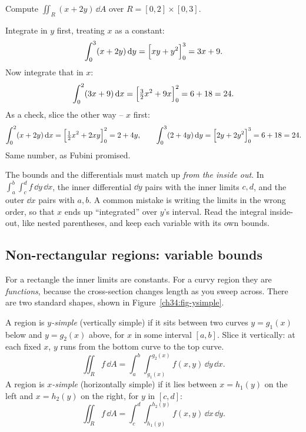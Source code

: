 \begin{example}
\label{ch34:ex-rect}
Compute $\displaystyle\iint_R (x+2y)\,\dd A$ over $R=[0,2]\times[0,3]$.

Integrate in $y$ first, treating $x$ as a constant:
\[
  \int_0^3 (x+2y)\,\mathrm{d} y
  =\Big[xy+y^2\Big]_{0}^{3}
  =3x+9 .
\]
Now integrate that in $x$:
\[
  \int_0^2 (3x+9)\,\mathrm{d} x
  =\Big[\tfrac{3}{2}x^2+9x\Big]_{0}^{2}
  =6+18=24 .
\]
As a check, slice the other way -- $x$ first:
\[
  \int_0^2 (x+2y)\,\mathrm{d} x=\Big[\tfrac12 x^2+2xy\Big]_{0}^{2}=2+4y,
  \qquad
  \int_0^3 (2+4y)\,\mathrm{d} y=\Big[2y+2y^2\Big]_{0}^{3}=6+18=24 .
\]
Same number, as Fubini promised.
\end{example}

\begin{trapbox}
The bounds and the differentials must match up \emph{from the inside out}. In
$\int_a^b\!\int_c^d f\,\dd y\,\dd x$, the inner differential $\dd y$ pairs with
the inner limits $c,d$, and the outer $\dd x$ pairs with $a,b$. A common
mistake is writing the limits in the wrong order, so that $x$ ends up
``integrated'' over $y$'s interval. Read the integral inside-out, like nested
parentheses, and keep each variable with its own bounds.
\end{trapbox}

\subsection{Non-rectangular regions: variable bounds}

For a rectangle the inner limits are constants. For a curvy region they are
\emph{functions}, because the cross-section changes length as you sweep across.
There are two standard shapes, shown in Figure~\ref{ch34:fig-ysimple}.

A region is \emph{$y$-simple} (vertically simple) if it sits between two curves
$y=g_1(x)$ below and $y=g_2(x)$ above, for $x$ in some interval $[a,b]$. Slice it
vertically: at each fixed $x$, $y$ runs from the bottom curve to the top curve.
\[
  \iint_R f\,\dd A=\int_a^b\!\int_{g_1(x)}^{g_2(x)} f(x,y)\,\dd y\,\dd x .
\]
A region is \emph{$x$-simple} (horizontally simple) if it lies between
$x=h_1(y)$ on the left and $x=h_2(y)$ on the right, for $y$ in $[c,d]$:
\[
  \iint_R f\,\dd A=\int_c^d\!\int_{h_1(y)}^{h_2(y)} f(x,y)\,\dd x\,\dd y .
\]

